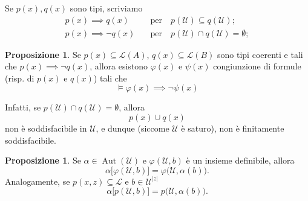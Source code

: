 \documentclass[10pt]{article}
\newcommand{\1}{\mathds{1}}
\theoremstyle{definition}%
\newtheorem{prop}[thm]{Proposizione}
\theoremstyle{plain}
\theoremstyle{remark}
\begin{document}
Se \(p(x),q(x)\) sono tipi, scriviamo
\begin{align*}
p(x)\implies q(x)\quad&\text{per}\quad p(\mathcal{U}) \subseteq q(\mathcal{U});\\
p(x)\implies \lnot q(x)\quad&\text{per}\quad p(\mathcal{U}) \cap q(\mathcal{U})=\emptyset;
\end{align*}

\begin{prop}
Se \(p(x) \subseteq \mathcal{L}(A)\), \(q(x) \subseteq \mathcal{L}(B)\) sono tipi coerenti e tali che \(p(x)\implies\lnot q(x)\), allora esistono \(\varphi(x)\) e \(\psi(x)\) congiunzione di formule (risp. di \(p(x)\) e \(q(x)\)) tali che
\begin{equation*}
\vDash \varphi(x)\implies\lnot\psi(x)
\end{equation*}
\end{prop}

Infatti, se \(p(\mathcal{U})\cap q(\mathcal{U}) = \emptyset\), allora
\begin{equation*}
p(x)\cup q(x)
\end{equation*}
non è soddisfacibile in \(\mathcal{U}\), e dunque (siccome \(\mathcal{U}\) è saturo), non è finitamente soddisfacibile.

\begin{prop}
Se \(\alpha \in \operatorname{Aut}(\mathcal{U})\) e \(\varphi(\mathcal{U},b)\) è un insieme definibile, allora
\begin{equation*}
\alpha\big[\varphi(\mathcal{U},b)\big] = \varphi\big(\mathcal{U},\alpha(b)\big).
\end{equation*}
Analogamente, se \(p(x,z) \subseteq \mathcal{L}\) e \(b \in \mathcal{U}^{|z|}\)
\begin{equation*}
\alpha\big[p(\mathcal{U},b)\big]=p\big(\mathcal{U},\alpha(b)\big).
\end{equation*}
\end{prop}
\end{document}
